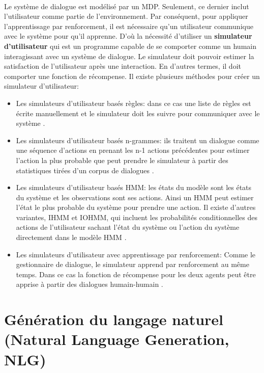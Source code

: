 \paragraph{}
Le système de dialogue est modélisé par un MDP. Seulement, ce dernier inclut l'utilisateur comme partie de l'environnement. Par conséquent, pour appliquer l'apprentissage par renforcement, il est nécessaire qu'un utilisateur communique avec le système pour qu'il apprenne. D'où la nécessité d'utiliser un \textbf{simulateur d'utilisateur} qui est un programme capable de se comporter comme un humain interagissant avec un système de dialogue. Le simulateur doit pouvoir estimer la satisfaction de l'utilisateur après une interaction. En d'autres termes, il doit comporter une fonction de récompense. Il existe plusieurs méthodes pour créer un simulateur d'utilisateur:
\begin{itemize}
	\item Les simulateurs d'utilisateur basés règles: dans ce cas une liste de règles est écrite manuellement et le simulateur doit les suivre pour communiquer avec le système \citep{Schatzmann2007}.
	\item Les simulateurs d'utilisateur basés n-grammes: ils traitent un dialogue comme une séquence d'actions en prenant les n-1 actions précédentes pour estimer l'action la plus probable que peut prendre le simulateur à partir des statistiques tirées d'un corpus de dialogues \citep{Georgila2005}.
	\item Les simulateurs d'utilisateur basés HMM: les états du modèle sont les états du système et les observations sont ses actions. Ainsi un HMM peut estimer l'état le plus probable du système pour prendre une action. Il existe d'autres variantes, IHMM et IOHMM, qui incluent les probabilités conditionnelles des actions de l'utilisateur sachant l'état du système ou l'action du système directement dans le modèle HMM \citep{Cuayhuitl2005}.
	\item Les simulateurs d'utilisateur avec apprentissage par renforcement: Comme le gestionnaire de dialogue, le simulateur apprend par renforcement au même temps. Dans ce cas la fonction de récompense pour les deux agents peut être apprise à partir des dialogues humain-humain \citep{Chandramohan2011}.
\end{itemize}







\section{Génération du langage naturel (Natural Language Generation, NLG)}\label{NLG}
